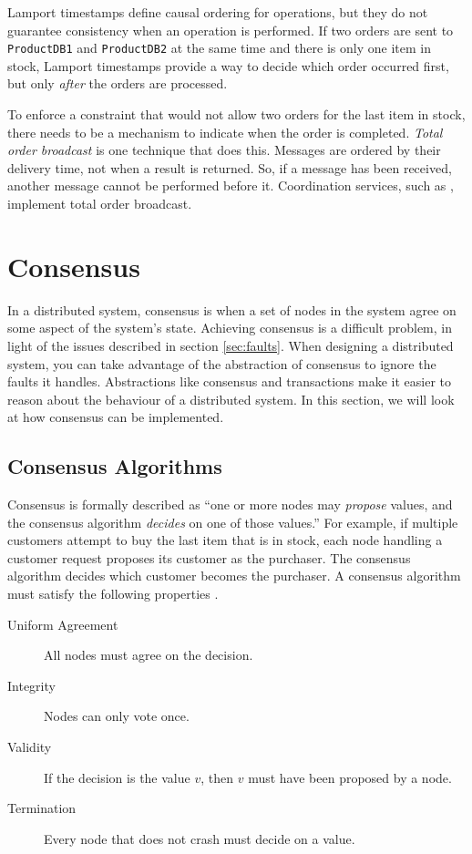 Lamport timestamps define causal ordering for operations, but they do not guarantee consistency when an operation is performed.
If two orders are sent to \texttt{ProductDB1} and \texttt{ProductDB2} at the same time and there is only one item in stock,
Lamport timestamps provide a way to decide which order occurred first, but only \emph{after} the orders are processed.

To enforce a constraint that would not allow two orders for the last item in stock,
there needs to be a mechanism to indicate when the order is completed.
\emph{Total order broadcast} is one technique that does this.
Messages are ordered by their delivery time, not when a result is returned.
So, if a message has been received, another message cannot be performed before it.
Coordination services, such as , implement total order broadcast.


\section{Consensus}\label{sec:consensus}

In a distributed system, consensus is when a set of nodes in the system agree on some aspect of the system's state.
Achieving consensus is a difficult problem, in light of the issues described in section \ref{sec:faults}.
When designing a distributed system, you can take advantage of the abstraction of consensus to ignore the faults it handles.
Abstractions like consensus and transactions \cite{distributed2-notes} make it easier to reason about the behaviour of a distributed system.
In this section, we will look at how consensus can be implemented.

\subsection{Consensus Algorithms}

Consensus is formally described as ``one or more nodes may \emph{propose} values,
and the consensus algorithm \emph{decides} on one of those values.''
For example, if multiple customers attempt to buy the last item that is in stock,
each node handling a customer request proposes its customer as the purchaser.
The consensus algorithm decides which customer becomes the purchaser.
A consensus algorithm must satisfy the following properties \cite{cachin2011Distributed}.

\begin{description}
    \item[Uniform Agreement] All nodes must agree on the decision.
    \item[Integrity] Nodes can only vote once.
    \item[Validity] If the decision is the value $v$, then $v$ must have been proposed by a node.
    \item[Termination] Every node that does not crash must decide on a value.
\end{description}

